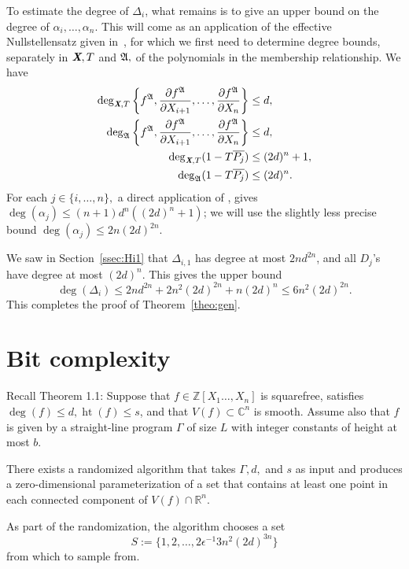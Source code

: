 \documentclass[sigconf]{acmart}
\def\Xb{\textit{\textbf{X}}}
\def\pjb{\overline{P_{j}}}
\DeclareMathOperator{\htt}{ht}
\def\C{\mathbb{C}}
\def\R{\mathbb{R}}
\def\D{\Delta}
\newcommand{\ZZ}{{\mathbb{Z}}}
\def\A{\frak{A}}
\begin{document}
To estimate the degree of $\D_{i}$, what remains is to give an upper
bound on the degree of $\alpha_i,\dots,\alpha_n$. This will come as an
application of the effective Nullstellensatz given in~\cite{EN}, for
which we first need to determine degree bounds, separately in $\Xb,T$
and $\A,$ of the polynomials in the membership relationship. We have
\begin{align*}
\deg_{\Xb,T}\left\{ 
f^\A,\frac{\partial f^\A}{\partial X_{i+1}},\hdots,\frac{\partial f^\A}{\partial X_n}
\right\}&\leq d,\\
\deg_{\A}  
\left\{ 
f^\A,\frac{\partial f^\A}{\partial X_{i+1}},\hdots,\frac{\partial f^\A}{\partial X_n}
\right\}& \leq d,\\
\deg_{\Xb,T}(1-T\pjb) &\leq (2d)^n +1,\\
\deg_{\A}(1-T\pjb)& \leq (2d)^n.
\end{align*}
For each $j \in \{i,\hdots,n\},$ a direct application of \cite[Theorem
0.5]{EN}, gives $\deg(\alpha_j) \le (n+1)d^n((2d)^n+1)$; we will use
the slightly less precise bound $\deg(\alpha_j) \le 2n(2d)^{2n}$.


We saw in Section~\ref{ssec:Hi1} that $\D_{i,1}$ has degree at most
$2nd^{2n}$, and all $D_j$'s have degree at most $(2d)^n$. This gives
the upper bound
$$\deg(\D_i) \le 2nd^{2n} + 2n^2(2d)^{2n} + n(2d)^n \le 6n^2 (2d)^{2n}.$$
This completes the proof of Theorem~\ref{theo:gen}.



\section{Bit complexity}
Recall Theorem 1.1:   Suppose that $f\in\ZZ[X_1\hdots,X_n]$ is squarefree, satisfies
  $\deg(f) \leq d, \htt(f) \leq s$, and that $V(f) \subset \C^n$ is
  smooth.  Assume also that $f$ is given by a straight-line program
  $\Gamma$ of size $L$ with integer constants of height at most $b.$

  There exists a randomized algorithm that takes $\Gamma, d,$ and $s$
  as input and produces a zero-dimensional parameterization of a set
  that contains at least one point in each connected component of
  $V(f) \cap \R^n$. 
  
  As part of the randomization, the algorithm chooses a set 
  \[
  S := \{1,2,\hdots,2\epsilon^{-1}3n^2(2d)^{3n}\}
  \]
  from which to sample from. 
  
\end{document}
